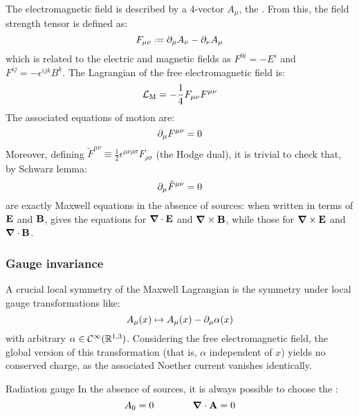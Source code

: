 The electromagnetic field is described by a 4-vector $ A_\mu $, the . From this, the field strength tensor is defined as:
\begin{equation}
  F_{\mu \nu} \defeq \pa_\mu A_\nu - \pa_\nu A_\mu
\end{equation}
which is related to the electric and magnetic fields as $ F^{0i} = - E^i $ and $ F^{ij} = - \epsilon^{ijk} B^k $. The Lagrangian of the free electromagnetic field is:
\begin{equation}
  \mathcal{L}_\text{M} = - \frac{1}{4} F_{\mu \nu} F^{\mu \nu}
  \label{eq:maxw-lag}
\end{equation}
The associated equations of motion are:
\begin{equation}
  \partial_\mu F^{\mu \nu} = 0
  \label{eq:maxw-1}
\end{equation}
Moreover, defining $ \tilde{F}^{\mu \nu} \equiv \frac{1}{2} \epsilon^{\mu \nu \rho \sigma} F_{\rho \sigma} $ (the Hodge dual), it is trivial to check that, by Schwarz lemma:
\begin{equation}
  \partial_\mu \tilde{F}^{\mu \nu} = 0
  \label{eq:maxw-2}
\end{equation}
 are exactly Maxwell equations in the absence of sources: when written in terms of $ \mathbf{E} $ and $ \mathbf{B} $,  gives the equations for $ \boldsymbol{\nabla} \cdot \mathbf{E} $ and $ \boldsymbol{\nabla} \times \mathbf{B} $, while  those for $ \boldsymbol{\nabla} \times \mathbf{E} $ and $ \boldsymbol{\nabla} \cdot \mathbf{B} $.

\subsubsection{Gauge invariance}

A crucial local symmetry of the Maxwell Lagrangian is the symmetry under local gauge transformations like:
\begin{equation}
  A_\mu(x) \mapsto A_\mu(x) - \partial_\mu \alpha(x)
  \label{eq:qed-gauge-inv}
\end{equation}
with arbitrary $ \alpha \in \mathcal{C}^\infty(\mathbb{R}^{1,3}) $. Considering the free electromagnetic field, the global version of this transformation (that is, $ \alpha $ independent of $ x $) yields no conserved charge, as the associated Noether current vanishes identically.

\begin{theorem}{Radiation gauge}{}
  In the absence of sources, it is always possible to choose the :
  \begin{equation}
    A_0 = 0
    \qquad \qquad
    \boldsymbol{\nabla} \cdot \mathbf{A} = 0
    \label{eq:radiation-gauge}
  \end{equation}
\end{theorem}

